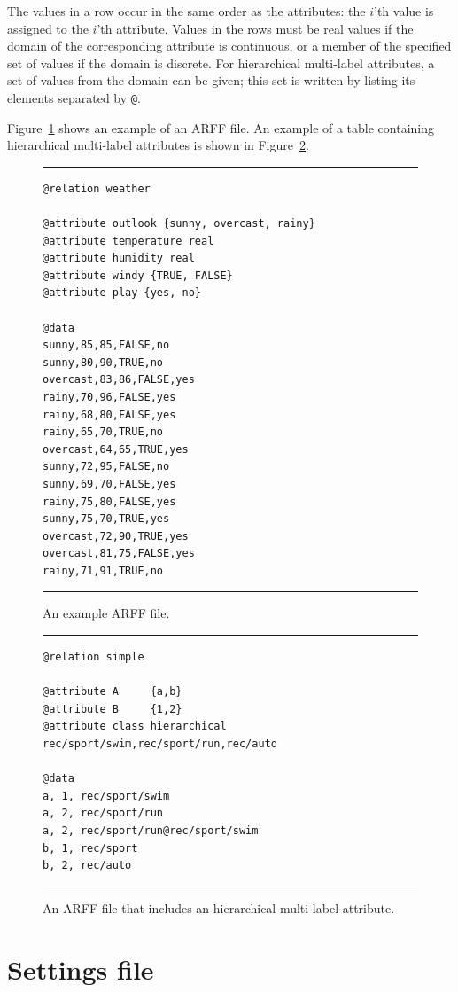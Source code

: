 \documentclass[a4paper]{report}
\begin{document}
The values in a	 row occur in the same order as the attributes: the $i$'th value is assigned to the $i$'th attribute.  Values in the rows must be real values if the domain of the corresponding attribute is continuous, or a member of the specified set of values if the domain is discrete.  For hierarchical multi-label attributes, a set of values from the domain can be given; this set is written by listing its elements separated by \verb^@^.

Figure~\ref{arff:fig} shows an example of an ARFF file.  An example of a table containing hierarchical multi-label attributes is shown in Figure~\ref{arffhmc:fig}.

\begin{figure}
\hrule
\begin{verbatim}
@relation weather

@attribute outlook {sunny, overcast, rainy}
@attribute temperature real
@attribute humidity real
@attribute windy {TRUE, FALSE}
@attribute play {yes, no}

@data
sunny,85,85,FALSE,no
sunny,80,90,TRUE,no
overcast,83,86,FALSE,yes
rainy,70,96,FALSE,yes
rainy,68,80,FALSE,yes
rainy,65,70,TRUE,no
overcast,64,65,TRUE,yes
sunny,72,95,FALSE,no
sunny,69,70,FALSE,yes
rainy,75,80,FALSE,yes
sunny,75,70,TRUE,yes
overcast,72,90,TRUE,yes
overcast,81,75,FALSE,yes
rainy,71,91,TRUE,no
\end{verbatim}
\hrule
\caption{An example ARFF file.}
\label{arff:fig}
\end{figure}


\begin{figure}
\hrule
\begin{verbatim}
@relation simple

@attribute A     {a,b}
@attribute B     {1,2}
@attribute class hierarchical rec/sport/swim,rec/sport/run,rec/auto

@data
a, 1, rec/sport/swim
a, 2, rec/sport/run
a, 2, rec/sport/run@rec/sport/swim
b, 1, rec/sport
b, 2, rec/auto
\end{verbatim}
\hrule
\caption{An ARFF file that includes an hierarchical multi-label attribute.}
\label{arffhmc:fig}
\end{figure}

\chapter{Settings file}
\end{document}
